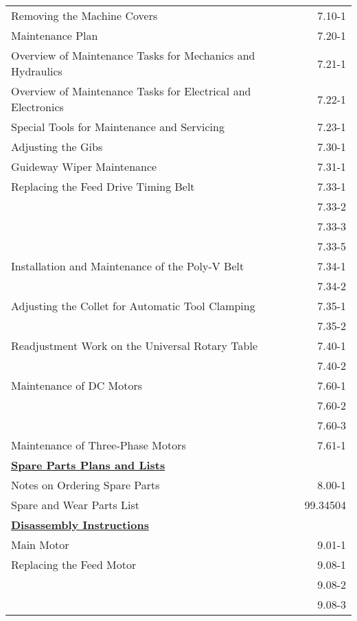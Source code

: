 \newpage

\begin{tabularx}{\textwidth}{X r}
    Removing the Machine Covers \dotfill & 7.10-1 \\
    Maintenance Plan \dotfill & 7.20-1 \\
    Overview of Maintenance Tasks for Mechanics and Hydraulics \dotfill & 7.21-1 \\
    Overview of Maintenance Tasks for Electrical and Electronics \dotfill & 7.22-1 \\
    Special Tools for Maintenance and Servicing \dotfill & 7.23-1 \\
    Adjusting the Gibs \dotfill & 7.30-1 \\
    Guideway Wiper Maintenance \dotfill & 7.31-1 \\
    Replacing the Feed Drive Timing Belt \dotfill & 7.33-1 \\
     & 7.33-2 \\
     & 7.33-3 \\
     & 7.33-5 \\
    Installation and Maintenance of the Poly-V Belt \dotfill & 7.34-1 \\
     & 7.34-2 \\
    Adjusting the Collet for Automatic Tool Clamping \dotfill & 7.35-1 \\
     & 7.35-2 \\
    Readjustment Work on the Universal Rotary Table \dotfill & 7.40-1 \\
     & 7.40-2 \\
    Maintenance of DC Motors \dotfill & 7.60-1 \\
     & 7.60-2 \\
     & 7.60-3 \\
    Maintenance of Three-Phase Motors \dotfill & 7.61-1 \\[0.5cm]

    \textbf{\underline{Spare Parts Plans and Lists}} & \\ %
    Notes on Ordering Spare Parts \dotfill & 8.00-1 \\
    Spare and Wear Parts List \dotfill & 99.34504 \\[0.5cm]

    \textbf{\underline{Disassembly Instructions}} & \\ %
    Main Motor \dotfill & 9.01-1 \\
    Replacing the Feed Motor \dotfill & 9.08-1 \\
     & 9.08-2 \\
     & 9.08-3 \\
\end{tabularx}

